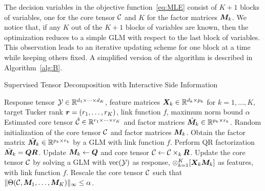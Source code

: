 \documentclass{article}
\theoremstyle{definition}
\theoremstyle{definition}
\begin{document}
The decision variables in the objective function~\eqref{eq:MLE} consist of $K+1$ blocks of variables, one for the core tensor $\mathcal{C}$ and $K$ for the factor matrices $\bm M_k$. We notice that, if any $K$ out of the $K+1$ blocks of variables are known, then the optimization reduces to a simple GLM with respect to the last block of variables. This observation leads to an iterative updating scheme for one block at a time while keeping others fixed.  A simplified version of the algorithm is described in Algorithm~\ref{alg:B}. 


\begin{algorithm}[htb]
\caption{Supervised Tensor Decomposition with Interactive Side Information}\label{alg:B}
\begin{algorithmic}[1]
\INPUT Response tensor $\mathcal{Y}\in \mathbb{R}^{d_1\times \cdots \times d_K}$, feature matrices $\bm X_k\in\mathbb{R}^{d_k\times p_k}$ for $k=1,\ldots,K$, target Tucker rank $\bm{r}=(r_1,\ldots,r_K)$, link function $f$, maximum norm bound $\alpha$
\OUTPUT Estimated core tensor $\hat {\mathcal{C}}\in\mathbb{R}^{r_1\times \cdots \times r_K}$ and factor matrices $\hat {\bm M}_k\in\mathbb{R}^{p_k\times r_k}$. 
\State Random initialization of the core tensor $\mathcal{C}$ and factor matrices $\bm M_k$. 
\State Obtain the factor matrix $\tilde {\bm M}_k\in\mathbb{R}^{p_k\times r_k}$ by a GLM with link function $f$.
\State Perform QR factorization $\tilde {\bm M}_k=\bm{Q}\bm{R}$. Update $\bm M_k\leftarrow \bm{Q}$ and core tensor $\mathcal{C}\leftarrow \mathcal{C}\times_k \bm{R}$.
\EndFor
\State Update the core tensor $\mathcal{C}$ by solving a GLM with $\textup{vec}(\mathcal{Y})$ as response, $\otimes_{k=1}^K[ \bm X_k\bm M_k]$ as features, with link function $f$.
Rescale the core tensor $\mathcal{C}$ such that $\lVert\Theta(\mathcal{C},\bm M_1,\ldots,\bm M_K)\rVert_\infty\leq \alpha$. 
\EndWhile
\end{algorithmic}
\end{algorithm}
\end{document}
